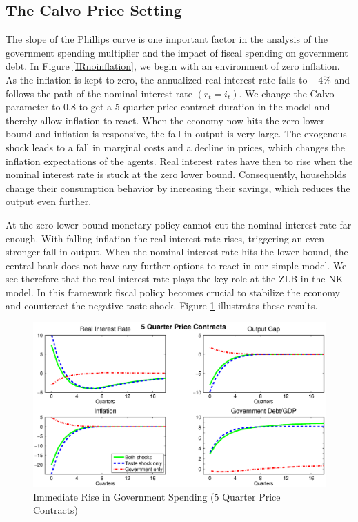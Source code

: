\documentclass[12pt,a4paper,oneside,titlepage]{article}
\begin{document}
\subsection*{The Calvo Price Setting}
The slope of the Phillips curve is one important factor in the analysis of the government spending multiplier and the impact of fiscal spending on government debt. In Figure \ref{IRnoinflation}, we begin with an environment of zero inflation.
As the inflation is kept to zero, the annualized real interest rate falls to $-4\%$ and follows the path of the nominal interest rate $\left(r_t = i_t\right)$. We change the Calvo parameter to 0.8 to get a 5 quarter price contract duration in the model and thereby allow inflation to react. When the economy now hits the zero lower bound and inflation is responsive, the fall in output is very large. The exogenous shock leads to a fall in marginal costs and a decline in prices, which changes the inflation expectations of the agents. Real interest rates have then to rise when the nominal interest rate is stuck at the zero lower bound. Consequently, households change their consumption behavior by increasing their savings, which reduces the output even further.
\par
\bigskip
At the zero lower bound monetary policy cannot cut the nominal interest rate far enough. With falling inflation the real interest rate rises, triggering an even stronger fall in output. When the nominal interest rate hits the lower bound, the central bank does not have any further options to react in our simple model. We see therefore that the real interest rate plays the key role at the ZLB in the NK model. In this framework fiscal policy becomes crucial to stabilize the economy and counteract the negative taste shock. Figure \ref{IR5quarter} illustrates these results.

\begin{figure}[!th]
\includegraphics[width=\textwidth]{Paperpics/Figure25quarter}
\caption{Immediate Rise in Government Spending (5 Quarter Price Contracts)}
\label{IR5quarter}
\end{figure}
\end{document}
